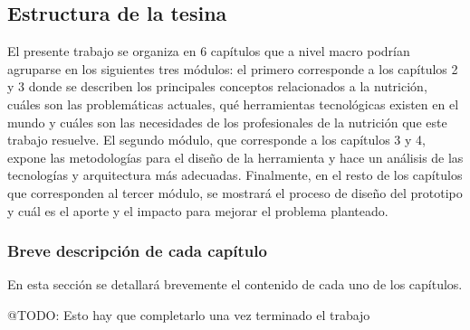 \subsection{Estructura de la tesina}
\label{estructura}

El presente trabajo se organiza en 6 capítulos que a nivel macro podrían agruparse en los siguientes tres módulos: el primero corresponde a los capítulos 2 y 3 donde se describen los principales conceptos relacionados a la nutrición, cuáles son las problemáticas actuales, qué herramientas tecnológicas existen en el mundo y cuáles son las necesidades de los profesionales de la nutrición que este trabajo resuelve. El segundo módulo, que corresponde a los capítulos 3 y 4, expone las metodologías para el diseño de la herramienta y hace un análisis de las tecnologías y arquitectura más adecuadas. Finalmente, en el resto de los capítulos que corresponden al tercer módulo, se mostrará el proceso de diseño del prototipo y cuál es el aporte y el impacto para mejorar el problema planteado.



\subsubsection{Breve descripción de cada capítulo}

En esta sección se detallará brevemente el contenido de cada uno de los capítulos.

@TODO: Esto hay que completarlo una vez terminado el trabajo

